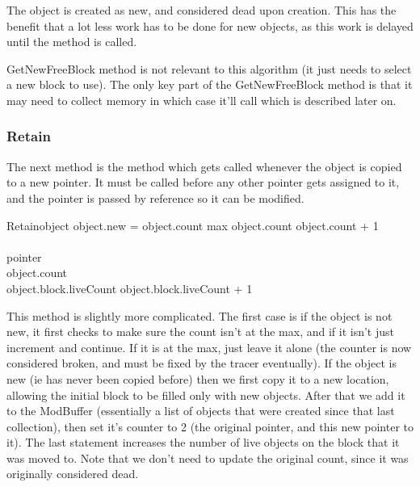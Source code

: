 \documentclass{article}
\begin{document}
The object is created as new, and considered dead upon creation. This has the benefit that a lot less work has to be done for new objects, as this work is delayed until the  method is called.

GetNewFreeBlock method is not relevant to this algorithm (it just needs to select a new block to use). The only key part of the GetNewFreeBlock method is that it may need to collect memory in which case it'll call  which is described later on.

\subsubsection{Retain}

The next method is the  method which gets called whenever the object is copied to a new pointer. It must be called before any other pointer gets assigned to it, and the pointer is passed by reference so it can be modified.

\begin{pseudocode}{Retain}{object}
	\IF object.new = \FALSE \THEN
	\BEGIN
		\IF object.count \NOT max \THEN
		object.count \GETS object.count + 1\\
		\RETURN{}
	\END\\
	pointer \GETS {}\\
	object.count \\
	object.block.liveCount \GETS object.block.liveCount + 1
	\RETURN{}\\
\end{pseudocode}

This method is slightly more complicated. The first case is if the object is not new, it first checks to make sure the count isn't at the max, and if it isn't just increment and continue. If it is at the max, just leave it alone (the counter is now considered broken, and must be fixed by the tracer eventually). If the object is new (ie has never been copied before) then we first copy it to a new location, allowing the initial block to be filled only with new objects. After that we add it to the ModBuffer (essentially a list of objects that were created since that last collection), then set it's counter to 2 (the original pointer, and this new pointer to it). The last statement increases the number of live objects on the block that it was moved to. Note that we don't need to update the original count, since it was originally considered dead.
\end{document}
